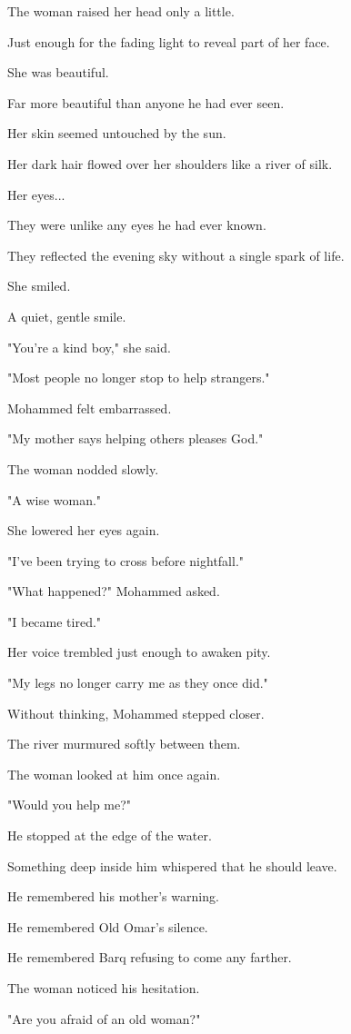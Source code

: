 \documentclass[12pt,openany]{book}
\begin{document}
The woman raised her head only a little.

Just enough for the fading light to reveal part of her face.

She was beautiful.

Far more beautiful than anyone he had ever seen.

Her skin seemed untouched by the sun.

Her dark hair flowed over her shoulders like a river of silk.

Her eyes...

They were unlike any eyes he had ever known.

They reflected the evening sky without a single spark of life.

She smiled.

A quiet, gentle smile.

"You're a kind boy," she said.

"Most people no longer stop to help strangers."

Mohammed felt embarrassed.

"My mother says helping others pleases God."

The woman nodded slowly.

"A wise woman."

She lowered her eyes again.

"I've been trying to cross before nightfall."

"What happened?" Mohammed asked.

"I became tired."

Her voice trembled just enough to awaken pity.

"My legs no longer carry me as they once did."

Without thinking, Mohammed stepped closer.

The river murmured softly between them.

The woman looked at him once again.

"Would you help me?"

He stopped at the edge of the water.

Something deep inside him whispered that he should leave.

He remembered his mother's warning.

He remembered Old Omar's silence.

He remembered Barq refusing to come any farther.

The woman noticed his hesitation.

"Are you afraid of an old woman?"
\end{document}
